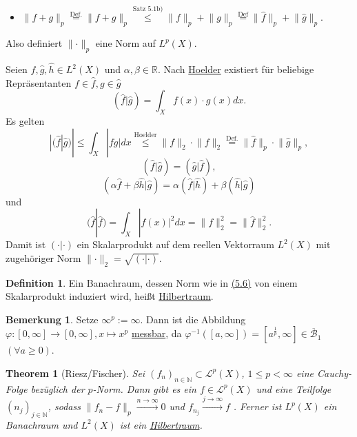 \documentclass[a4paper]{report}
\newcommand{\R}{\mathbb{R}}
\newcommand{\N}{\mathbb{N}}
\newcommand{\Borel}{\mathcal{B}}
\newcommand{\Leb}{\mathcal{L}}
\newcommand{\jlabel}[1]{\label{j_#1}}
\newcommand{\jterm}[1]{\jlabel{#1}\uline{#1}}
\newcommand{\jshortlink}[1]{\jhyperref{#1}{\text{#1}}}
\newcommand{\jhyperref}[2]{\hyperref[j_#1]{#2}}
\newcommand{\jlink}[1]{\jhyperref{#1}{#1}}
\newcommand{\fu}{\text{\textit{(f.ü.)}}}
\newcommand{\jabb}[3]{ #1: #2 \rightarrow #3 }
\newcommand{\jspace}{\vspace{8pt}}
\newcommand{\jspacesmall}{\vspace{4pt}}
\theoremstyle{plain}
\newtheorem{thm}{Theorem}[chapter]
\theoremstyle{definition}
\newtheorem*{defn*}{Definition}
\newtheorem*{bem*}{Bemerkung}
\begin{document}
{{{{\begin{itemize}
    \item $\lVert f + g \rVert_p \overset{\text{Def.}}{=} \lVert f+g \rVert_p \overset{\jshortlink{Satz 5.1b)}}{\le} \lVert f \rVert_p + \lVert g \rVert_p \overset{\text{Def}}{=} \lVert \hat{f} \rVert_p + \lVert \hat{g} \rVert_p$.
\end{itemize}
Also definiert $\lVert \cdot \rVert_p$ eine Norm auf $L^p(X)$.

\jspace

Seien $\hat{f},\hat{g},\hat{h} \in L^2(X)$ und $\alpha,\beta \in \R$. Nach \jlink{Hoelder} existiert für beliebige Repräsentanten $f\in\hat{f},g\in\hat{g}$
\begin{equation}
    \jlabel{(5.3)}
    (\hat{f}|\hat{g}) = \int_X f(x)\cdot g(x) dx.
\end{equation}
Es gelten
\begin{equation}
    \jlabel{(5.4)}
    |(\hat{f}|\hat{g})| \le \int_X |fg| dx \overset{\jshortlink{Hoelder}}{\le} \lVert f \rVert_2 \cdot \lVert f \rVert_2 \overset{\text{Def.}}{=} \lVert \hat{f} \rVert_p \cdot \lVert \hat{g} \rVert_p,
\end{equation}
\[
    (\hat{f}|\hat{g}) = (\hat{g}|\hat{f}),
\]
\begin{equation}
    \jlabel{(5.5)}
    (\alpha \hat{f} + \beta \hat{h} | \hat{g}) = \alpha (\hat{f}|\hat{h}) + \beta (\hat{h}|\hat{g})
\end{equation}
und
\begin{equation}
    \jlabel{(5.6)}
    (\hat{f}|\hat{f}) = \int_X |f(x)|^2 dx = \lVert f \rVert_2^2 = \lVert \hat{f} \rVert_2^2.
\end{equation}
Damit ist $(\cdot|\cdot)$ ein Skalarprodukt auf dem reellen Vektorraum $L^2(X)$ mit zugehöriger Norm $\lVert \cdot \rVert_2 = \sqrt{(\cdot | \cdot)}$.

\begin{defn*}
    Ein Banachraum, dessen Norm wie in \jlink{(5.6)} von einem Skalarprodukt induziert wird, heißt \jterm{Hilbertraum}.
\end{defn*}

\begin{bem*}
    Setze $\infty^p := \infty$. Dann ist die Abbildung $\jabb{\varphi}{[0,\infty]}{[0,\infty]}, x\mapsto x^p$ \jlink{messbar}, da $\varphi
    ^{-1}([a,\infty]) = [a^\frac{1}{p},\infty]\in \overline{\Borel}_1$ $(\forall a \ge 0)$.
\end{bem*}

\begin{thm}[Riesz/Fischer]
    \jlabel{Thm 5.6}
    Sei $(f_n)_{n\in\N}\subset \Leb^p(X)$, $1\le p < \infty$ eine Cauchy-Folge bezüglich der $p$-Norm. Dann gibt es ein $f\in\Leb^p(X)$ und eine Teilfolge $(n_j)_{j\in\N}$, sodass $\lVert f_n - f\rVert_p \xrightarrow{n\to \infty} 0$ und $f_{n_j} \xrightarrow{j\to \infty} f$ \fu.
    \jspacesmall
    Ferner ist $L^p(X)$ ein Banachraum und $L^2(X)$ ist ein \jlink{Hilbertraum}.
    

\end{thm}}}}}
\end{document}
